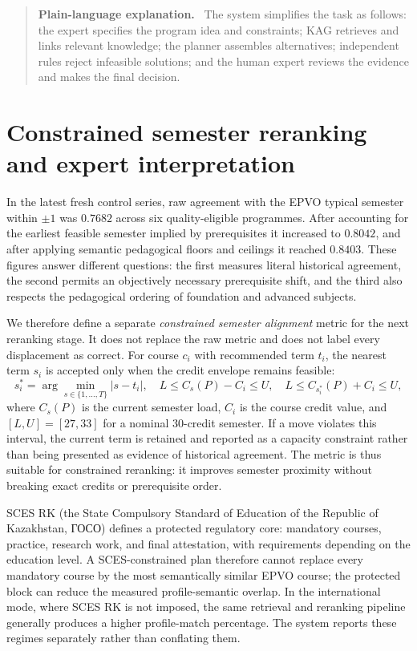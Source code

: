 \documentclass[twoside,11pt]{article}
\newenvironment{plainbox}{\begin{quote}\small\noindent\textbf{Plain-language explanation.}\ }{\end{quote}}
\begin{document}
\begin{plainbox}
The system simplifies the task as follows: the expert specifies the program idea and constraints; KAG retrieves and links relevant knowledge; the planner assembles alternatives; independent rules reject infeasible solutions; and the human expert reviews the evidence and makes the final decision.
\end{plainbox}

\section{Constrained semester reranking and expert interpretation}

In the latest fresh control series, raw agreement with the EPVO typical semester within $\pm1$ was $0.7682$ across six quality-eligible programmes. After accounting for the earliest feasible semester implied by prerequisites it increased to $0.8042$, and after applying semantic pedagogical floors and ceilings it reached $0.8403$. These figures answer different questions: the first measures literal historical agreement, the second permits an objectively necessary prerequisite shift, and the third also respects the pedagogical ordering of foundation and advanced subjects.

We therefore define a separate \emph{constrained semester alignment} metric for the next reranking stage. It does not replace the raw metric and does not label every displacement as correct. For course $c_i$ with recommended term $t_i$, the nearest term $s_i$ is accepted only when the credit envelope remains feasible:
\begin{equation}
 s_i^*=\arg\min_{s\in\{1,\ldots,T\}} |s-t_i|,
 \quad L\leq C_s(P)-C_i\leq U,
 \quad L\leq C_{s_i^*}(P)+C_i\leq U,
\end{equation}
where $C_s(P)$ is the current semester load, $C_i$ is the course credit value, and $[L,U]=[27,33]$ for a nominal 30-credit semester. If a move violates this interval, the current term is retained and reported as a capacity constraint rather than being presented as evidence of historical agreement. The metric is thus suitable for constrained reranking: it improves semester proximity without breaking exact credits or prerequisite order.

SCES RK (the State Compulsory Standard of Education of the Republic of Kazakhstan, ГОСО) defines a protected regulatory core: mandatory courses, practice, research work, and final attestation, with requirements depending on the education level. A SCES-constrained plan therefore cannot replace every mandatory course by the most semantically similar EPVO course; the protected block can reduce the measured profile-semantic overlap. In the international mode, where SCES RK is not imposed, the same retrieval and reranking pipeline generally produces a higher profile-match percentage. The system reports these regimes separately rather than conflating them.
\end{document}
